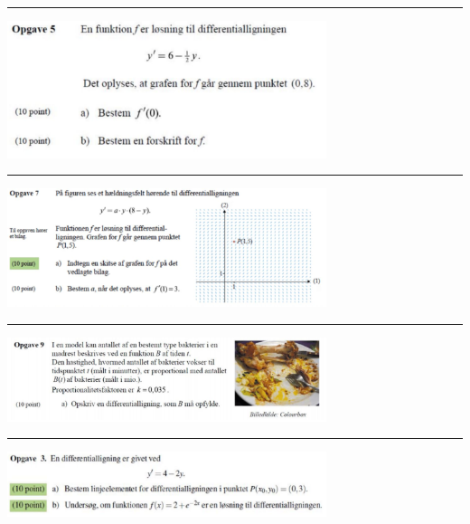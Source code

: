 \begin{center}
	\hrule
	\includegraphics[width=0.7\textwidth]{Billeder/opg6.jpg}
	\hrule	
	\includegraphics[width=0.7\textwidth]{Billeder/opg7.jpg}
	\hrule	
	\includegraphics[width=0.7\textwidth]{Billeder/opg8.jpg}
	\hrule
	\includegraphics[width=0.7\textwidth]{Billeder/opg9.jpg}
\end{center}

